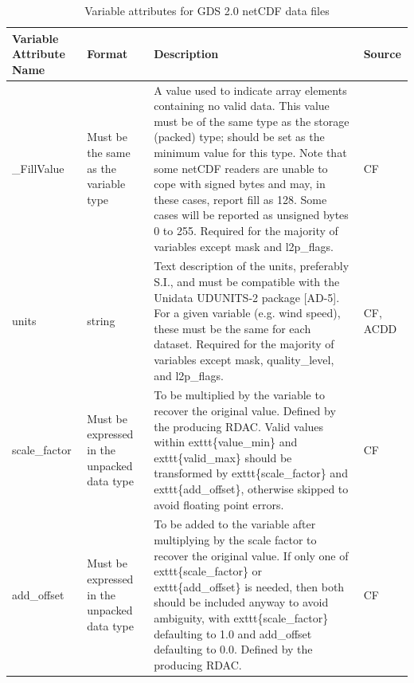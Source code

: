 \begin{longtable}{|p{}|p{}|p{}|p{}|}
\caption{Variable attributes for GDS 2.0 netCDF data files}
\label{tab:variable-attributes} \\
\hline \endfirsthead \endhead \endfoot \hline \endlastfoot
\rowcolor{lightgray} \textbf{Variable Attribute Name} & \textbf{Format} & \textbf{Description} & \textbf{Source} \\ \hline
\rowcolor{LightCyan} \_FillValue & Must be the same as the variable type & A value used to indicate array elements containing no valid data. This value must be of the same type as the storage (packed) type; should be set as the minimum value for this type. Note that some netCDF readers are unable to cope with signed bytes and may, in these cases, report fill as 128. Some cases will be reported as unsigned bytes 0 to 255. Required for the majority of variables except mask and l2p\_flags. & CF \\ \hline

\rowcolor{LightCyan} units & string & Text description of the units, preferably S.I., and must be compatible with the Unidata UDUNITS-2 package [AD-5]. For a given variable (e.g. wind speed), these must be the same for each dataset. Required for the majority of variables except mask, quality\_level, and l2p\_flags. & CF, ACDD \\ \hline

\rowcolor{LightCyan} scale\_factor & Must be expressed in the unpacked data type & To be multiplied by the variable to recover the
original value. Defined by the producing
RDAC. Valid values within \hspace{0.5cm}exttt\{value\_min\} and
\hspace{0.5cm}exttt\{valid\_max\} should be transformed by
\hspace{0.5cm}exttt\{scale\_factor\} and \hspace{0.5cm}exttt\{add\_offset\}, otherwise
skipped to avoid floating point errors. & CF \\ \hline

\rowcolor{LightCyan} add\_offset & Must be expressed in the unpacked data type & To be added to the variable after multiplying by the scale factor to recover the original value. If only one of \hspace{0.5cm}exttt\{scale\_factor\} or \hspace{0.5cm}exttt\{add\_offset\} is needed, then both should be included anyway to avoid ambiguity, with \hspace{0.5cm}exttt\{scale\_factor\} defaulting to 1.0 and add\_offset defaulting to 0.0. Defined by the producing RDAC. & CF \\ \hline


\end{longtable}
